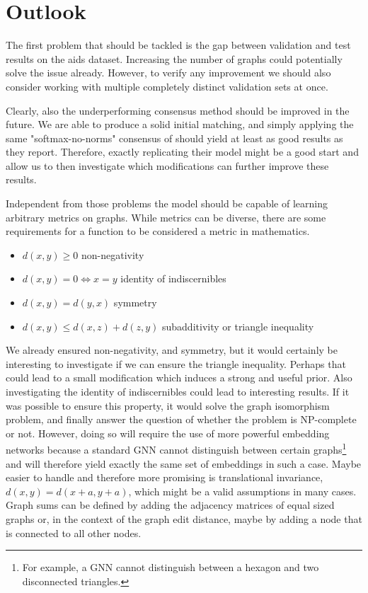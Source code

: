 \section{Outlook}

The first problem that should be tackled is the gap between validation and test results on the aids dataset. Increasing the number of graphs could potentially solve the issue already. However, to verify any improvement we should also consider working with multiple completely distinct validation sets at once.

Clearly, also the underperforming consensus method should be improved in the future. We are able to produce a solid initial matching, and simply applying the same "softmax-no-norms" consensus of \cite{fey2020_update} should yield at least as good results as they report. Therefore, exactly replicating their model might be a good start and allow us to then investigate which modifications can further improve these results.

Independent from those problems the model should be capable of learning arbitrary metrics on graphs. While metrics can be diverse, there are some requirements for a function to be considered a metric in mathematics.
\begin{itemize}
    \itemsep0em
    \item $d(x,y) \ge 0$ non-negativity
    \item $d(x,y) = 0 \Leftrightarrow x = y$ identity of indiscernibles
    \item $d(x,y)  = d(y,x)$ symmetry
    \item $d(x,y) \le d(x,z) + d(z, y)$ subadditivity or triangle inequality
\end{itemize}
We already ensured non-negativity, and symmetry, but it would certainly be interesting to investigate if we can ensure the triangle inequality. Perhaps that could lead to a small modification which induces a strong and useful prior. Also investigating the identity of indiscernibles could lead to interesting results. If it was possible to ensure this property, it would solve the graph isomorphism problem, and finally answer the question of whether the problem is NP-complete or not. However, doing so will require the use of more powerful embedding networks because a standard GNN cannot distinguish between certain graphs\footnote{For example, a GNN cannot distinguish between a hexagon and two disconnected triangles.} and will therefore yield exactly the same set of embeddings in such a case. Maybe easier to handle and therefore more promising is translational invariance, $d(x,y) = d(x+a,y+a)$, which might be a valid assumptions in many cases. Graph sums can be defined by adding the adjacency matrices of equal sized graphs \cite{graph_sum2004} or, in the context of the graph edit distance, maybe by adding a node that is connected to all other nodes.

